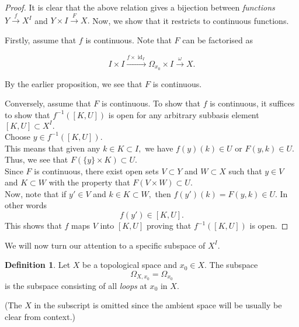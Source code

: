 \documentclass[12pt]{article}
\theoremstyle{definition}
\numberwithin{thm}{section}
\newtheorem{defn}[thm]{Definition}
\newcommand{\id}{\operatorname{id}}
\begin{document}
\begin{proof} 
	It is clear that the above relation gives a bijection between \emph{functions} $Y\overset{f}{\longrightarrow}X^I$ and $Y\times I\overset{F}{\longrightarrow}X.$ Now, we show that it restricts to continuous functions.

	Firstly, assume that $f$ is continuous. Note that $F$ can be factorised as

	\begin{equation*} 
		I \times I \overset{f \times \id_I}{\longrightarrow} \Omega_{x_0}\times I \overset{\omega}{\longrightarrow} X.
	\end{equation*}

	By the earlier proposition, we see that $F$ is continuous.

	Conversely, assume that $F$ is continuous. To show that $f$ is continuous, it suffices to show that $f^{-1}([K, U])$ is open for any arbitrary subbasis element $[K, U] \subset X^I.$\\
	Choose $y \in f^{-1}([K, U]).$ \\
	This means that given any $k \in K \subset I,$ we have $f(y)(k) \in U$ or $F(y, k) \in U.$ Thus, we see that $F(\{y\} \times K) \subset U.$\\
	Since $F$ is continuous, there exist open sets $V \subset Y$ and $W \subset X$ such that $y \in V$ and $K \subset W$ with the property that $F(V \times W) \subset U.$ \\
	Now, note that if $y' \in V$ and $k \in K \subset W,$ then $f(y')(k) = F(y, k) \in U.$ In other words
	\begin{equation*} 
		f(y') \in [K, U].
	\end{equation*}
	This shows that $f$ maps $V$ into $[K, U]$ proving that $f^{-1}([K, U])$ is open. 
\end{proof}

We will now turn our attention to a specific subspace of $X^I.$

\begin{defn}
	Let $X$ be a topological space and $x_0 \in X.$ The subspace
	\begin{equation*} 
		\Omega_{X, x_0} = \Omega_{x_0}
	\end{equation*}
	is the subspace consisting of all \emph{loops} at $x_0$ in $X.$
\end{defn}

(The $X$ in the subscript is omitted since the ambient space will be usually be clear from context.)
\end{document}
